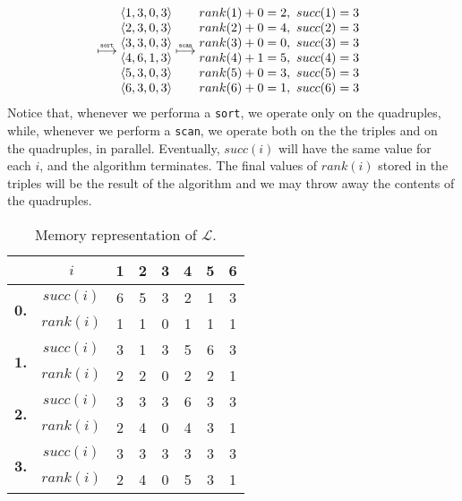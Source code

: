 \begin{align*}
\begin{matrix}
  \end{matrix}
  \stackrel{\text{\tiny \tt sort}}{\longmapsto}
  \begin{matrix}
    \langle 1, 3, 0, 3 \rangle \\
    \langle 2, 3, 0, 3 \rangle \\
    \langle 3, 3, 0, 3 \rangle \\
    \langle 4, 6, 1, 3 \rangle \\
    \langle 5, 3, 0, 3 \rangle \\
    \langle 6, 3, 0, 3 \rangle \\
  \end{matrix}
  \stackrel{\text{\tiny \tt scan}}{\longmapsto}
  \begin{matrix}
    rank(1) + 0 = 2,\ succ(1) = 3 \\
    rank(2) + 0 = 4,\ succ(2) = 3 \\
    rank(3) + 0 = 0,\ succ(3) = 3 \\
    rank(4) + 1 = 5,\ succ(4) = 3 \\
    rank(5) + 0 = 3,\ succ(5) = 3 \\
    rank(6) + 0 = 1,\ succ(6) = 3 \\
  \end{matrix}
\end{align*}
%
Notice that, whenever we performa a {\tt sort}, we operate only on the
quadruples, while, whenever we perform a {\tt scan}, we operate both on the the
triples and on the quadruples, in parallel. Eventually, $succ(i)$ will have the
same value for each $i$, and the algorithm terminates. The final values of
$rank(i)$ stored in the triples will be the result of the algorithm and we may
throw away the contents of the quadruples.
%
\begin{table}[h]
  \centering
  \begin{tabular}{cc|cccccc}
                            & $i$       & 1 & 2 & 3 & 4 & 5 & 6 \\ \hline\hline
    \multirow{2}{*}{\bf 0.} & $succ(i)$ & 6 & 5 & 3 & 2 & 1 & 3 \\
                            & $rank(i)$ & 1 & 1 & 0 & 1 & 1 & 1 \\ \hline
    \multirow{2}{*}{\bf 1.} & $succ(i)$ & 3 & 1 & 3 & 5 & 6 & 3 \\
                            & $rank(i)$ & 2 & 2 & 0 & 2 & 2 & 1 \\ \hline
    \multirow{2}{*}{\bf 2.} & $succ(i)$ & 3 & 3 & 3 & 6 & 3 & 3 \\
                            & $rank(i)$ & 2 & 4 & 0 & 4 & 3 & 1 \\ \hline
    \multirow{2}{*}{\bf 3.} & $succ(i)$ & 3 & 3 & 3 & 3 & 3 & 3 \\
                            & $rank(i)$ & 2 & 4 & 0 & 5 & 3 & 1 \\ \hline
  \end{tabular}
  \caption{Memory representation of $\mathcal{L}$.}
  \label{tab:list}
\end{table}
